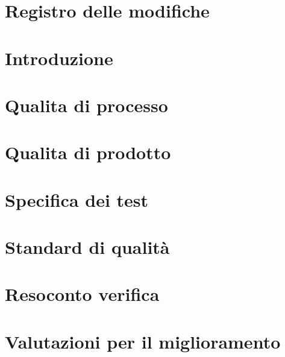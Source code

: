 \documentclass[a4paper, oneside, openany, dvipsnames, table]{article}
\begin{document}
\copertina{}

\section*{Registro delle modifiche}\label{sec:Registro-modifiche}


\newpage
\tableofcontents

\newpage
\listoftables

\newpage
\listoffigures

\newpage
\section{Introduzione}\label{sec:Introduzione}


\newpage
\section{Qualita di processo}\label{sec:Qualita-di-processo}


\newpage
\section{Qualita di prodotto}\label{sec:Qualita-di-prodotto}


\newpage
\section{Specifica dei test}\label{sec:Specifica-dei-test}


\appendix
\newpage
\section{Standard di qualità}\label{sec:Standard-di-qualita}


\newpage
\section{Resoconto verifica}\label{sec:Resoconto-verifica}


\newpage
\section{Valutazioni per il miglioramento}\label{sec:Valutazioni-per-il-miglioramento}

\end{document}
